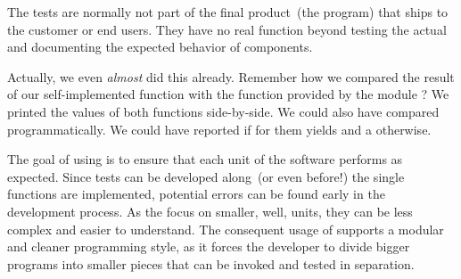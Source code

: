 The tests are normally not part of the final product~(the program) that ships to the customer or end users.
They have no real function beyond testing the actual and documenting the expected behavior of components.

Actually, we even \emph{almost} did this already.
Remember how we compared the result of our self-implemented  function with the  function provided by the module ?
We printed the values of both functions side-by-side.
We could also have compared programmatically.
We could have reported  if  for them yields  and a  otherwise.

The goal of using  is to ensure that each unit of the software performs as expected.
Since tests can be developed along~(or even before!) the single functions are implemented, potential errors can be found early in the development process.
As the  focus on smaller, well, units, they can be less complex and easier to understand.
The consequent usage of  supports a modular and cleaner programming style, as it forces the developer to divide bigger programs into smaller pieces that can be invoked and tested in separation.

